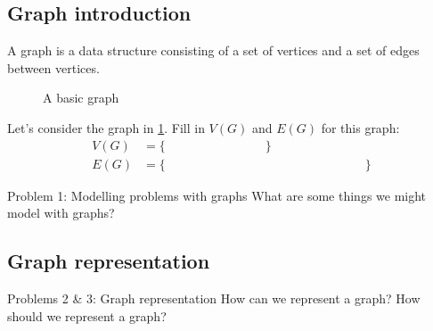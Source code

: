 \documentclass{article}
\begin{document}
\subsection{Graph introduction}
A graph is a data structure consisting of a set of vertices and a set of edges between vertices. 
\begin{figure}[h]
    \centering
    \caption{A basic graph}
    \label{graph-intro-graph}
\end{figure}

\vspace{8cm}

\begin{quickcheck}
    Let's consider the graph in \ref{graph-intro-graph}. Fill in $V(G)$ and $E(G)$ for this graph:
    \begin{align*}
        V(G) &= \{ \qquad \qquad \qquad \qquad \}\\
        E(G) &= \{\qquad \qquad \qquad \qquad \qquad \qquad \qquad \qquad \}
    \end{align*}
\end{quickcheck}

\begin{problem}{Problem 1: Modelling problems with graphs}
    What are some things we might model with graphs?
\end{problem}


\newpage

\subsection{Graph representation}
\begin{problem}{Problems 2 \& 3: Graph representation}
    How can we represent a graph? How should we represent a graph?
\end{problem}
\end{document}
